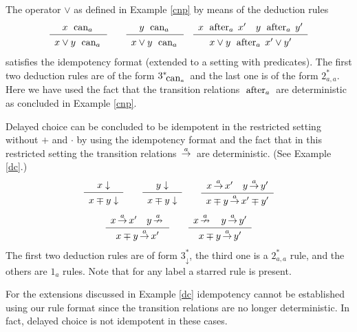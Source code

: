 \begin{example}
The operator $\lor$ as defined in Example \ref{cnp} by means of the deduction rules
\[
\sosrule{x \cando{a}}{x \lor y \cando{a}}
\qquad
\sosrule{y \cando{a}}{x \lor y \cando{a}}
\quad
\sosrule{x \after{a} x' \quad y \after{a} y'}{x \lor y  \after{a} x' \lor y'}
\]
satisfies the idempotency format (extended to a setting with predicates). The first two deduction rules are of the form $3^*_{\mathrel{\mbox{ can}_{a}\,}}$ and the last one is of the form $2^*_{a,a}$. Here we have used the fact that the transition relations $\mathrel{\mbox{ after}_{a}\,}$ are deterministic as concluded in Example \ref{cnp}.
\end{example}

\begin{example}
Delayed choice can be concluded to be idempotent in the restricted setting without $+$ and $\cdot$ by using the idempotency format and the fact that in this restricted setting the transition relations $\,{\stackrel{{a}}{\rightarrow}}\,$ are deterministic. (See Example \ref{dc}.)
\[
\sosrule{x \downarrow}{x \mp y \downarrow}
\qquad
\sosrule{y \downarrow}{x \mp y \downarrow}
\qquad
\sosrule{x \trans{a} x' \quad y \trans{a} y'}{x \mp y \trans{a} x' \mp y'}
\]
\[
\sosrule{x \trans{a} x' \quad y \ntrans{a}}{x \mp y \trans{a} x'}
\qquad
\sosrule{x \ntrans{a} \quad y \trans{a} y'}{x \mp y \trans{a} y'}
\]
The first two deduction rules are of form $3^*_{\downarrow}$, the third one is a $2^*_{a,a}$ rule, and the others are $1_{a}$ rules. Note that for any label a starred rule is present.

For the extensions discussed in Example \ref{dc} idempotency cannot be established using our rule format
since the transition relations are no longer deterministic. In fact, delayed choice is not idempotent in these cases.
\end{example}

